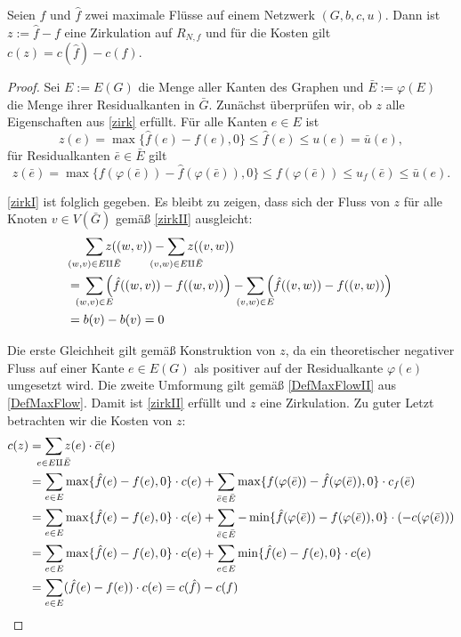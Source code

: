 \begin{lem}\label{f-f}Seien $f$ und $\hat{f}$ zwei maximale Flüsse auf einem Netzwerk $(G,b,c,u)$. Dann ist $z:=\hat{f}-f$ eine Zirkulation auf $R_{N,f}$ und für die Kosten gilt $c(z)=c(\hat{f})-c(f)$.\end{lem}
\begin{proof}Sei $E:=E(G)$ die Menge aller Kanten des Graphen und $\bar{E}:=\varphi(E)$ die Menge ihrer Residualkanten in $\bar{G}$. Zunächst überprüfen wir, ob $z$ alle Eigenschaften aus \cref{zirk} erfüllt. Für alle Kanten $e\in E$ ist
\begin{equation*}z(e)=\max\{\hat{f}(e)-f(e),0\}\leq\hat{f}(e)\leq u(e)=\bar{u}(e),\end{equation*}
für Residualkanten $\bar{e}\in \bar{E}$ gilt
\begin{equation*}z(\bar{e})=\max\{f(\varphi(\bar{e}))-\hat{f}(\varphi(\bar{e})),0\}\leq f(\varphi(\bar{e}))\leq u_f(\bar{e})\leq \bar{u}(e).\end{equation*}

\cref{zirkI} ist folglich gegeben. Es bleibt zu zeigen, dass sich der Fluss von $z$ für alle Knoten $v\in V(\bar{G})$ gemäß \cref{zirkII} ausgleicht:
\begin{align*}&\sum_{\mathclap{(w,v)\in E\amalg\bar{E}}} z((w,v)) - \sum_{\mathclap{(v,w)\in E\amalg\bar{E}}} z((v,w))\\
={}&\sum_{\mathclap{(w,v)\in E}} \Big(\hat{f}((w,v)) -  f((w,v))\Big) -  \sum_{\mathclap{(v,w)\in E}} \Big(\hat{f}((v,w)) - f((v,w))\Big)\\
={}&b(v)-b(v)=0\end{align*}

Die erste Gleichheit gilt gemäß Konstruktion von $z$, da ein theoretischer negativer Fluss auf einer Kante $e\in E(G)$ als positiver auf der Residualkante $\varphi(e)$ umgesetzt wird. Die zweite Umformung gilt gemäß \cref{DefMaxFlowII} aus \cref{DefMaxFlow}. Damit ist \cref{zirkII} erfüllt und $z$ eine Zirkulation. Zu guter Letzt betrachten wir die Kosten von $z$:
\begin{align*}c(z)&=\sum_{\mathclap{e\in E\amalg\bar{E}}} z(e)\cdot \bar{c}(e)\\
&=\sum_{e\in E}\max\{\hat{f}(e)-f(e),0\}\cdot c(e) + \sum_{\bar{e}\in \bar{E}}\max\{f(\varphi(\bar{e}))-\hat{f}(\varphi(\bar{e})),0\}\cdot c_f(\bar{e})\\
&=\sum_{e\in E}\max\{\hat{f}(e)-f(e),0\}\cdot c(e) + \sum_{\bar{e}\in \bar{E}}-\min\{\hat{f}(\varphi(\bar{e}))-f(\varphi(\bar{e})),0\}\cdot(- c(\varphi(\bar{e})))\\
&=\sum_{e\in E}\max\{\hat{f}(e)-f(e),0\}\cdot c(e) + \sum_{e\in E}\min\{\hat{f}(e)-f(e),0\}\cdot c(e)\\
&=\sum_{e\in E} (\hat{f}(e)-f(e))\cdot c(e) = c(\hat{f})-c(f)\qedhere
\end{align*}\end{proof}

